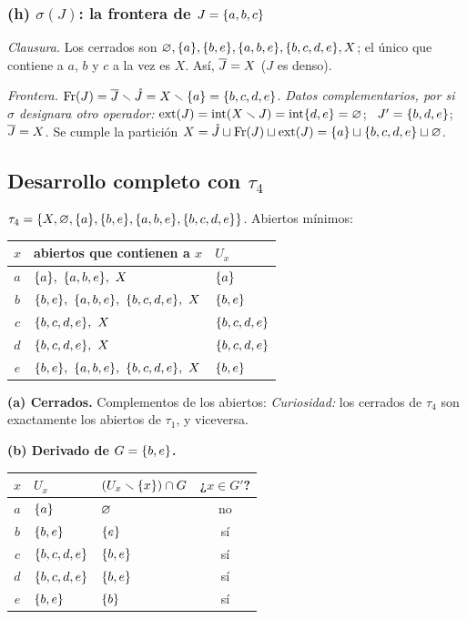 \subsubsection*{(h) $\sigma(J)$: la frontera de $J=\{a,b,c\}$}
\emph{Clausura.} Los cerrados son $\varnothing,\{a\},\{b,e\},\{a,b,e\},\{b,c,d,e\},X$; el único que contiene a $a$, $b$ y
$c$ a la vez es $X$. Así, $\overline{J}=X$ ($J$ es denso).

\emph{Frontera.} $\operatorname{Fr}(J)=\overline{J}\smallsetminus\mathring{J}=X\smallsetminus\{a\}=\{b,c,d,e\}$.
\emph{Datos complementarios, por si $\sigma$ designara otro operador:} $\operatorname{ext}(J)=\operatorname{int}(X\smallsetminus J)=\operatorname{int}\{d,e\}=\varnothing$;
\ $J'=\{b,d,e\}$;\ $\overline{J}=X$. Se cumple la partición $X=\mathring{J}\sqcup\operatorname{Fr}(J)\sqcup\operatorname{ext}(J)=\{a\}\sqcup\{b,c,d,e\}\sqcup\varnothing$.

\subsection{Desarrollo completo con \texorpdfstring{$\tau_4$}{tau4}}
$\tau_4=\{X,\varnothing,\{a\},\{b,e\},\{a,b,e\},\{b,c,d,e\}\}$. Abiertos mínimos:
\begin{center}\small\renewcommand{\arraystretch}{1.2}
\begin{tabular}{@{}cll@{}}\toprule
$x$ & abiertos que contienen a $x$ & $U_x$\\ \midrule
$a$ & $\s{a},\ \s{a,b,e},\ X$ & $\{a\}$\\
$b$ & $\s{b,e},\ \s{a,b,e},\ \s{b,c,d,e},\ X$ & $\{b,e\}$\\
$c$ & $\s{b,c,d,e},\ X$ & $\{b,c,d,e\}$\\
$d$ & $\s{b,c,d,e},\ X$ & $\{b,c,d,e\}$\\
$e$ & $\s{b,e},\ \s{a,b,e},\ \s{b,c,d,e},\ X$ & $\{b,e\}$\\ \bottomrule
\end{tabular}\end{center}

\textbf{(a) Cerrados.} Complementos de los abiertos:
\emph{Curiosidad:} los cerrados de $\tau_4$ son exactamente los abiertos de $\tau_1$, y viceversa.

\textbf{(b) Derivado de $G=\{b,e\}$.}
\begin{center}\small\renewcommand{\arraystretch}{1.2}
\begin{tabular}{@{}cllc@{}}\toprule
$x$ & $U_x$ & $(U_x\smallsetminus\{x\})\cap G$ & ¿$x\in G'$?\\ \midrule
$a$ & $\{a\}$ & $\varnothing$ & no\\
$b$ & $\{b,e\}$ & $\{e\}$ & sí\\
$c$ & $\{b,c,d,e\}$ & $\{b,e\}$ & sí\\
$d$ & $\{b,c,d,e\}$ & $\{b,e\}$ & sí\\
$e$ & $\{b,e\}$ & $\{b\}$ & sí\\ \bottomrule
\end{tabular}\end{center}

